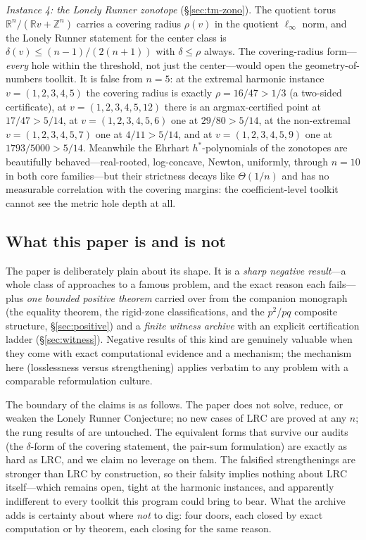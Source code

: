\documentclass[11pt,a4paper]{article}
\numberwithin{equation}{section}
\theoremstyle{plain}
\theoremstyle{definition}
\theoremstyle{remark}
\newcommand{\Z}{\mathbb{Z}}
\newcommand{\R}{\mathbb{R}}
\newcommand{\lrc}{\mathrm{LRC}}
\begin{document}
\emph{Instance 4: the Lonely Runner zonotope}
(\S\ref{sec:tm-zono}). The quotient torus $\R^n/(\R v+\Z^n)$ carries a
covering radius $\rho(v)$ in the quotient $\ell_\infty$ norm, and the
Lonely Runner statement for the center class is
$\delta(v)\le (n{-}1)/(2(n{+}1))$ with $\delta\le\rho$ always. The
covering-radius form---\emph{every} hole within the threshold, not just
the center---would open the geometry-of-numbers toolkit. It is false from
$n=5$: at the extremal harmonic instance $v=(1,2,3,4,5)$ the covering
radius is exactly $\rho=16/47>1/3$ (a two-sided certificate), at
$v=(1,2,3,4,5,12)$ there is an argmax-certified point at $17/47>5/14$,
at $v=(1,2,3,4,5,6)$ one at
$29/80>5/14$, at the non-extremal $v=(1,2,3,4,5,7)$ one at
$4/11>5/14$, and at $v=(1,2,3,4,5,9)$ one at $1793/5000>5/14$. Meanwhile the Ehrhart $h^*$-polynomials of the zonotopes
are beautifully behaved---real-rooted, log-concave, Newton, uniformly,
through $n=10$ in both core families---but their strictness decays like
$\Theta(1/n)$ and has no measurable correlation with the covering
margins: the coefficient-level toolkit cannot see the metric hole depth
at all.

\subsection{What this paper is and is not}

The paper is deliberately plain about its shape. It is a \emph{sharp
negative result}---a whole class of approaches to a famous problem, and
the exact reason each fails---plus \emph{one bounded positive theorem}
carried over from the companion monograph (the equality theorem, the
rigid-zone classifications, and the $p^2$/$pq$ composite structure,
\S\ref{sec:positive}) and a \emph{finite witness archive} with an explicit
certification ladder (\S\ref{sec:witness}). Negative results of this kind
are genuinely valuable when they come with exact computational evidence
and a mechanism; the mechanism here (losslessness versus strengthening)
applies verbatim to any problem with a comparable reformulation culture.

The boundary of the claims is as follows. The paper does not solve,
reduce, or weaken the Lonely Runner Conjecture; no new cases of $\lrc$
are proved at any $n$; the rung results of
\cite{Rosenfeld8,Trakulthongchai,Sungkawichai,Allikvere} are untouched.
The equivalent forms that survive our audits (the $\delta$-form of the
covering statement, the pair-sum formulation) are exactly as hard as
$\lrc$, and we claim no leverage on them. The falsified strengthenings
are stronger than $\lrc$ by construction, so their falsity implies
nothing about $\lrc$ itself---which remains open, tight at the harmonic
instances, and apparently indifferent to every toolkit this program could
bring to bear. What the archive adds is certainty about where \emph{not}
to dig: four doors, each closed by exact computation or by theorem, each
closing for the same reason.
\end{document}
